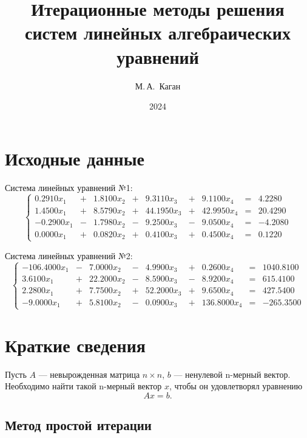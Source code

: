 \documentclass[12pt, a4paper]{article}
\title{Итерационные методы решения систем линейных алгебраических уравнений}
\author{М.\,А.~Каган}
\date{2024}
\begin{document}
	\maketitle
	\tableofcontents
	
	\newpage
	
	\section{Исходные данные}
	
	Система линейных уравнений №1:
	\[
	\left \{ \begin{array}{ccccccccc}
		0.2910 x_1  & +   &   1.8100 x_2 & +   &     9.3110 x_3 & +    &    9.1100 x_4 & = & 4.2280\\
		1.4500  x_1 & + &     8.5790 x_2 & +  &     44.1950 x_3  & +  &    42.9950 x_4  & = & 20.4290\\
		-0.2900 x_1  & - &     1.7980 x_2 & - &      9.2500 x_3   & - &    9.0500 x_4 & = & -4.2080  \\
		0.0000  x_1  & + &     0.0820 x_2  & +  &     0.4100 x_3 & +  &      0.4500 x_4 & = & 0.1220
	\end{array}	\right.
	\]
	 
	Система линейных уравнений №2:
	 \[
	 \left \{ \begin{array}{ccccccccc}
	 -106.4000 x_1 & - & 7.0000 x_2 & - & 4.9900 x_3 & + & 0.2600 x_4 & = & 1040.8100\\
	3.6100 x_1 & + & 22.2000 x_2 & - & 8.5900 x_3 & - & 8.9200 x_4 & = & 615.4100 \\
	 2.2800 x_1 & + & 7.7500 x_2 & + & 52.2000 x_3 & + & 9.6500 x_4 & = & 427.5400 \\
	 -9.0000 x_1 & + & 5.8100 x_2 & - & 0.0900 x_3 & + & 136.8000 x_4 & = & -265.3500
	\end{array}	\right.
	 \]  
	\section{Краткие сведения}
	Пусть $A$ --- невырожденная матрица $n \times n$, $b$ --- ненулевой n-мерный вектор. Необходимо найти такой n-мерный вектор $x$, чтобы он удовлетворял уравнению
	\begin{equation}
		\label{eq}
		A x = b.
	\end{equation}
  
	\subsection{Метод простой итерации}
	
\end{document}
